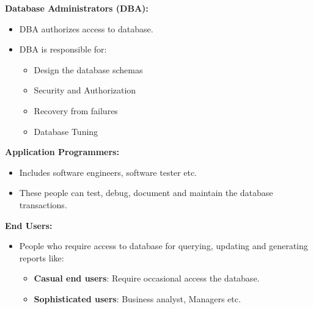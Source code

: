 
\begin{flushleft}

	\textbf{Database Administrators (DBA):}
	\begin{itemize}
			\item DBA authorizes access to database.
			\item DBA is responsible for:
			\begin{itemize}
				\item Design the database schemas
				\item Security and Authorization
				\item Recovery from failures
				\item Database Tuning
			\end{itemize}
	\end{itemize}
		
	\textbf{Application Programmers:}
	\begin{itemize}
		\item Includes software engineers, software tester etc.
		\item These people can test, debug, document and maintain the database transactions.
	\end{itemize}

	\textbf{End Users:}
	\begin{itemize}
		\item People who require access to database for querying, updating and generating reports like:
		\begin{itemize}
			\item \textbf{Casual end users}:  Require occasional access the database.
			\item \textbf{Sophisticated users}: Business analyst, Managers etc.
		\end{itemize}
		
	\end{itemize}
		
\end{flushleft}

\newpage

